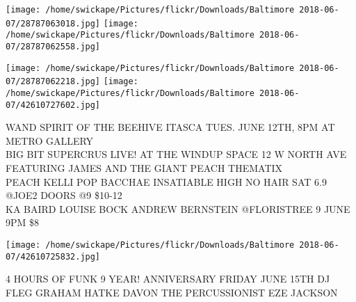 \documentclass[10pt,letterpaper]{article}
\begin{document}
\texttt{[image: /home/swickape/Pictures/flickr/Downloads/Baltimore 2018-06-07/28787063018.jpg]}
\texttt{[image: /home/swickape/Pictures/flickr/Downloads/Baltimore 2018-06-07/28787062558.jpg]}

\texttt{[image: /home/swickape/Pictures/flickr/Downloads/Baltimore 2018-06-07/28787062218.jpg]}
\texttt{[image: /home/swickape/Pictures/flickr/Downloads/Baltimore 2018-06-07/42610727602.jpg]}

WAND SPIRIT OF THE BEEHIVE ITASCA TUES. JUNE 12TH, 8PM AT METRO GALLERY\\
BIG BIT SUPERCRUS LIVE! AT THE WINDUP SPACE 12 W NORTH AVE FEATURING JAMES AND THE GIANT PEACH THEMATIX\\
PEACH KELLI POP BACCHAE INSATIABLE HIGH NO HAIR SAT 6.9 @JOE2 DOORS @9 \$10{-}12\\
KA BAIRD LOUISE BOCK ANDREW BERNSTEIN @FLORISTREE 9 JUNE 9PM \$8
\pagebreak

\texttt{[image: /home/swickape/Pictures/flickr/Downloads/Baltimore 2018-06-07/42610725832.jpg]}

4 HOURS OF FUNK 9 YEAR! ANNIVERSARY FRIDAY JUNE 15TH DJ FLEG GRAHAM HATKE DAVON THE PERCUSSIONIST EZE JACKSON
\pagebreak
\end{document}
